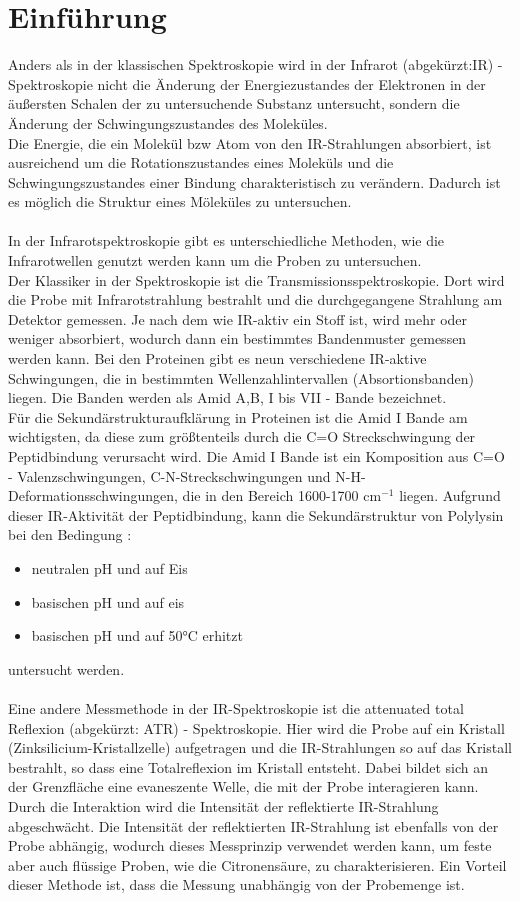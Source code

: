 \documentclass[10pt,a4paper]{article}
\begin{document}
	\section{Einführung}	
	Anders als in der klassischen Spektroskopie wird in der Infrarot (abgekürzt:IR) - Spektroskopie nicht die Änderung der Energiezustandes der Elektronen in der äußersten Schalen der zu untersuchende Substanz untersucht, sondern die Änderung der Schwingungszustandes des Moleküles.\\
	Die Energie, die ein Molekül bzw Atom von den IR-Strahlungen absorbiert, ist ausreichend um die Rotationszustandes eines Moleküls und die Schwingungszustandes einer Bindung charakteristisch zu verändern.
	Dadurch ist es möglich die Struktur eines Möleküles zu untersuchen.\\
	\\
	In der Infrarotspektroskopie gibt es unterschiedliche Methoden, wie die Infrarotwellen genutzt werden kann um die Proben zu untersuchen.\\
	Der Klassiker in der Spektroskopie ist die Transmissionsspektroskopie.
	Dort wird die Probe mit Infrarotstrahlung bestrahlt und die durchgegangene Strahlung am Detektor gemessen.
	Je nach dem wie IR-aktiv ein Stoff ist, wird mehr oder weniger absorbiert, wodurch dann ein bestimmtes Bandenmuster gemessen werden kann.
	Bei den Proteinen gibt es neun verschiedene IR-aktive Schwingungen, die in bestimmten Wellenzahlintervallen (Absortionsbanden) liegen. Die Banden werden als Amid A,B, I bis VII - Bande bezeichnet.\\
	Für die Sekundärstrukturaufklärung in Proteinen ist die Amid I Bande am wichtigsten, da diese zum größtenteils durch die C=O Streckschwingung der Peptidbindung verursacht wird. Die Amid I Bande ist ein Komposition aus C=O - Valenzschwingungen, C-N-Streckschwingungen und N-H-Deformationsschwingungen, die in den Bereich 1600-1700 cm$^{-1}$ liegen.
	Aufgrund dieser IR-Aktivität der Peptidbindung, kann die Sekundärstruktur von Polylysin bei den Bedingung :
	\begin{itemize}
		\item neutralen pH und auf Eis
		\item basischen pH und auf eis
		\item basischen pH und auf 50°C erhitzt
	\end{itemize}
	untersucht werden.\\
	\\
	Eine andere Messmethode in der IR-Spektroskopie ist die attenuated total Reflexion (abgekürzt: ATR) - Spektroskopie.
	Hier wird die Probe auf ein Kristall (Zinksilicium-Kristallzelle) aufgetragen und die IR-Strahlungen so auf das Kristall bestrahlt, so dass eine Totalreflexion im Kristall entsteht. Dabei bildet sich an der Grenzfläche eine evaneszente Welle, die mit der Probe interagieren kann. Durch die Interaktion wird die Intensität der reflektierte IR-Strahlung abgeschwächt\cite{ATR_wiki}.
	Die Intensität der reflektierten IR-Strahlung ist ebenfalls von der Probe abhängig, wodurch dieses Messprinzip verwendet werden kann, um feste aber auch flüssige Proben, wie die Citronensäure, zu charakterisieren.
	Ein Vorteil dieser Methode ist, dass die Messung unabhängig von der Probemenge \cite{ATR_MT} ist.
	
\end{document}
